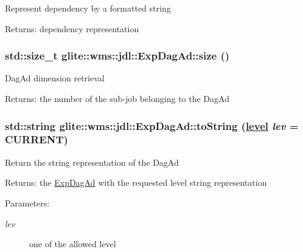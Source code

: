 Represent dependency by a formatted string \begin{Desc}
\item[Returns:]dependency representation \end{Desc}
\hypertarget{classglite_1_1wms_1_1jdl_1_1ExpDagAd_a16}{
\subsubsection[size]{\setlength{\rightskip}{0pt plus 5cm}std::size\_\-t glite::wms::jdl::Exp\-Dag\-Ad::size ()}}
\label{classglite_1_1wms_1_1jdl_1_1ExpDagAd_a16}


Dag\-Ad dimension retrieval \begin{Desc}
\item[Returns:]the number of the sub-job belonging to the Dag\-Ad \end{Desc}
\hypertarget{classglite_1_1wms_1_1jdl_1_1ExpDagAd_a5}{
\subsubsection[toString]{\setlength{\rightskip}{0pt plus 5cm}std::string glite::wms::jdl::Exp\-Dag\-Ad::to\-String (\hyperlink{classglite_1_1wms_1_1jdl_1_1ExpDagAd_w11}{level} {\em lev} = CURRENT)}}
\label{classglite_1_1wms_1_1jdl_1_1ExpDagAd_a5}


Return the string representation of the Dag\-Ad \begin{Desc}
\item[Returns:]the \hyperlink{classglite_1_1wms_1_1jdl_1_1ExpDagAd}{Exp\-Dag\-Ad} with the requested level string representation \end{Desc}
\begin{Desc}
\item[Parameters:]
\begin{description}
\item[{\em lev}]one of the allowed level \end{description}
\end{Desc}


